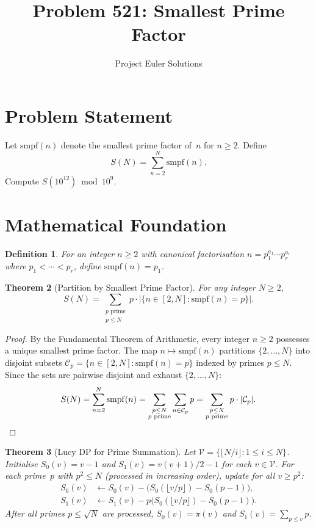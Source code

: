 \documentclass[11pt]{article}
\title{Problem 521: Smallest Prime Factor}
\author{Project Euler Solutions}
\date{}
\newtheorem{theorem}{Theorem}
\newtheorem{definition}[theorem]{Definition}
\begin{document}
\maketitle

\section{Problem Statement}
Let $\mathrm{smpf}(n)$ denote the smallest prime factor of~$n$ for $n \ge 2$. Define
\[
S(N) = \sum_{n=2}^{N} \mathrm{smpf}(n).
\]
Compute $S(10^{12}) \bmod 10^9$.

\section{Mathematical Foundation}

\begin{definition}
For an integer $n \ge 2$ with canonical factorisation $n = p_1^{a_1}\cdots p_r^{a_r}$ where $p_1 < \cdots < p_r$, define $\mathrm{smpf}(n) = p_1$.
\end{definition}

\begin{theorem}[Partition by Smallest Prime Factor]\label{thm:partition}
For any integer $N \ge 2$,
\[
S(N) = \sum_{\substack{p \text{ prime} \\ p \le N}} p \cdot \bigl|\{n \in [2,N] : \mathrm{smpf}(n) = p\}\bigr|.
\]
\end{theorem}

\begin{proof}
By the Fundamental Theorem of Arithmetic, every integer $n \ge 2$ possesses a unique smallest prime factor. The map $n \mapsto \mathrm{smpf}(n)$ partitions $\{2,\ldots,N\}$ into disjoint subsets $\mathcal{C}_p = \{n \in [2,N] : \mathrm{smpf}(n) = p\}$ indexed by primes $p \le N$. Since the sets are pairwise disjoint and exhaust $\{2,\ldots,N\}$:
\[
S(N) = \sum_{n=2}^{N} \mathrm{smpf}(n) = \sum_{\substack{p \le N \\ p \text{ prime}}} \sum_{n \in \mathcal{C}_p} p = \sum_{\substack{p \le N \\ p \text{ prime}}} p \cdot |\mathcal{C}_p|. \qedhere
\]
\end{proof}

\begin{theorem}[Lucy DP for Prime Summation]\label{thm:lucy}
Let $\mathcal{V} = \{\lfloor N/i\rfloor : 1 \le i \le N\}$. Initialise $S_0(v) = v-1$ and $S_1(v) = v(v+1)/2 - 1$ for each $v \in \mathcal{V}$. For each prime~$p$ with $p^2 \le N$ (processed in increasing order), update for all $v \ge p^2$:
\begin{align*}
S_0(v) &\gets S_0(v) - \bigl(S_0(\lfloor v/p\rfloor) - S_0(p-1)\bigr), \\
S_1(v) &\gets S_1(v) - p\bigl(S_0(\lfloor v/p\rfloor) - S_0(p-1)\bigr).
\end{align*}
After all primes $p \le \sqrt{N}$ are processed, $S_0(v) = \pi(v)$ and $S_1(v) = \sum_{p \le v} p$.
\end{theorem}
\end{document}
